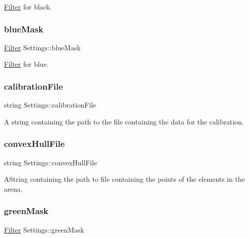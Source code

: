 \mbox{\hyperlink{class_filter}{Filter}} for black. 

\mbox{\label{class_settings_a2b425f747b936e82dfe0b609538f06f1}} 
\subsubsection{\texorpdfstring{blueMask}{blueMask}}
{\footnotesize\ttfamily \mbox{\hyperlink{class_filter}{Filter}} Settings\+::blue\+Mask}



\mbox{\hyperlink{class_filter}{Filter}} for blue. 

\mbox{\label{class_settings_ac6ff9ca8d90b9e43e26c069c88b7c699}} 
\subsubsection{\texorpdfstring{calibrationFile}{calibrationFile}}
{\footnotesize\ttfamily string Settings\+::calibration\+File}



A string containing the path to the file containing the data for the calibration. 

\mbox{\label{class_settings_aae9ea78e634fee8a76c2eb2b6fd09eeb}} 
\subsubsection{\texorpdfstring{convexHullFile}{convexHullFile}}
{\footnotesize\ttfamily string Settings\+::convex\+Hull\+File}



A\+String containing the path to file containing the points of the elements in the arena. 

\mbox{\label{class_settings_a05138be305e15677c8a84ddf27e4d9e8}} 
\subsubsection{\texorpdfstring{greenMask}{greenMask}}
{\footnotesize\ttfamily \mbox{\hyperlink{class_filter}{Filter}} Settings\+::green\+Mask}



